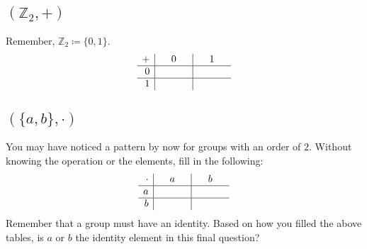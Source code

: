 		\subsection{$(\mathbb{Z}_2, +)$}
			Remember, $\mathbb{Z}_2 \coloneqq \{0, 1\}$.
			\begin{equation*}
				\begin{array}{r|c|c}
					+ & \mathmakebox[1cm]{0} & \mathmakebox[1cm]{1}\\\hline
					0 &                      &                     \\\hline
					1 &                      &
				\end{array}
			\end{equation*}
		\subsection{$(\{a,b\}, \cdot)$}
			You may have noticed a pattern by now for groups with an order of $2$. Without knowing the operation or the elements, fill in the following:
			\begin{equation*}
				\begin{array}{r|c|c}
					\cdot & \mathmakebox[1cm]{a} & \mathmakebox[1cm]{b}\\\hline
					a     &                      &                     \\\hline
					b     &                      &
				\end{array}
			\end{equation*}
			Remember that a group must have an identity. Based on how you filled the above tables, is $a$ or $b$ the identity element in this final question?

